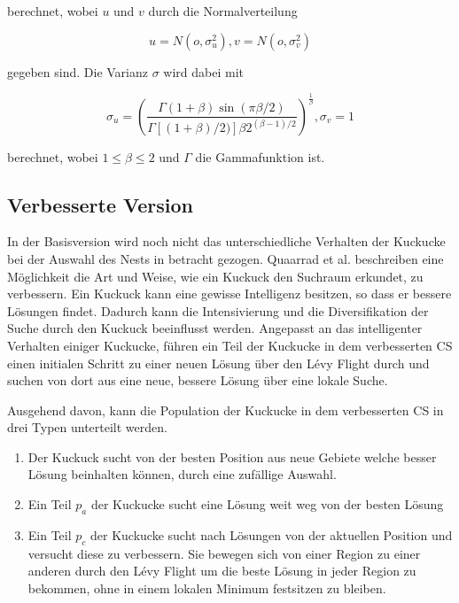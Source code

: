 \documentclass[conference]{IEEEtran}
\begin{document}
      berechnet, wobei $u$ und $v$ durch die Normalverteilung

      \begin{equation}
        u = N(o,\sigma_{u}^{2}), v = N(o,\sigma_{v}^{2})\label{eq}
      \end{equation}

        gegeben sind. Die Varianz $\sigma$ wird dabei mit

      \begin{equation}
        \sigma_{u} = \left(\frac{\Gamma(1 + \beta)\sin(\pi\beta/2)}{\Gamma[(1 + \beta)/2)]\beta2^{(\beta-1)/2}}\right)^{\frac{1}{\beta}} , \sigma_{v} = 1 \label{eq}
      \end{equation}

      berechnet, wobei $1 \leq \beta \leq 2$ und $\Gamma$ die Gammafunktion ist. 

    \subsection{Verbesserte Version}
      In der Basisversion wird noch nicht das unterschiedliche Verhalten der Kuckucke bei der Auswahl 
      des Nests in betracht gezogen. Quaarrad et al. \cite{b9} beschreiben eine Möglichkeit die Art und 
      Weise, wie ein Kuckuck den Suchraum erkundet, zu verbessern. Ein Kuckuck kann eine gewisse Intelligenz 
      besitzen, so dass er bessere Lösungen findet. Dadurch kann die Intensivierung und die Diversifikation der 
      Suche durch den Kuckuck beeinflusst werden. Angepasst an das intelligenter Verhalten einiger Kuckucke, 
      führen ein Teil der Kuckucke in dem verbesserten CS einen initialen Schritt zu einer neuen Lösung über 
      den Lévy Flight durch und suchen von dort aus eine neue, bessere Lösung über eine lokale Suche.

      Ausgehend davon, kann die Population der Kuckucke in dem verbesserten CS in drei Typen unterteilt werden.

      \begin{enumerate}
        \item Der Kuckuck sucht von der besten Position aus neue Gebiete welche besser Lösung beinhalten können, durch eine zufällige Auswahl.
        \item Ein Teil $p_{a}$ der Kuckucke sucht eine Lösung weit weg von der besten Lösung
        \item Ein Teil $p_{c}$ der Kuckucke sucht nach Lösungen von der aktuellen Position und versucht diese zu 
          verbessern. Sie bewegen sich von einer Region zu einer anderen durch den Lévy Flight um die beste Lösung 
          in jeder Region zu bekommen, ohne in einem lokalen Minimum festsitzen zu bleiben.
      \end{enumerate}
\end{document}
